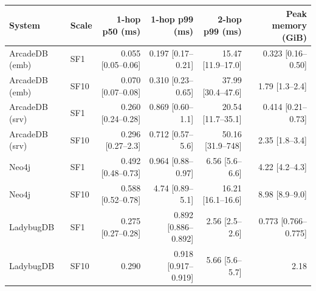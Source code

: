\begin{tabular}{llrrrr}
\toprule
System & Scale & 1-hop p50 (ms) & 1-hop p99 (ms) & 2-hop p99 (ms) & Peak memory (GiB) \\
\midrule
ArcadeDB (emb) & SF1 & 0.055 [0.05--0.06] & 0.197 [0.17--0.21] & 15.47 [11.9--17.0] & 0.323 [0.16--0.50] \\
ArcadeDB (emb) & SF10 & 0.070 [0.07--0.08] & 0.310 [0.23--0.65] & 37.99 [30.4--47.6] & 1.79 [1.3--2.4] \\
ArcadeDB (srv) & SF1 & 0.260 [0.24--0.28] & 0.869 [0.60--1.1] & 20.54 [11.7--35.1] & 0.414 [0.21--0.73] \\
ArcadeDB (srv) & SF10 & 0.296 [0.27--2.3] & 0.712 [0.57--5.6] & 50.16 [31.9--748] & 2.35 [1.8--3.4] \\
Neo4j & SF1 & 0.492 [0.48--0.73] & 0.964 [0.88--0.97] & 6.56 [5.6--6.6] & 4.22 [4.2--4.3] \\
Neo4j & SF10 & 0.588 [0.52--0.78] & 4.74 [0.89--5.1] & 16.21 [16.1--16.6] & 8.98 [8.9--9.0] \\
LadybugDB & SF1 & 0.275 [0.27--0.28] & 0.892 [0.886--0.892] & 2.56 [2.5--2.6] & 0.773 [0.766--0.775] \\
LadybugDB & SF10 & 0.290 & 0.918 [0.917--0.919] & 5.66 [5.6--5.7] & 2.18 \\
\bottomrule
\end{tabular}
